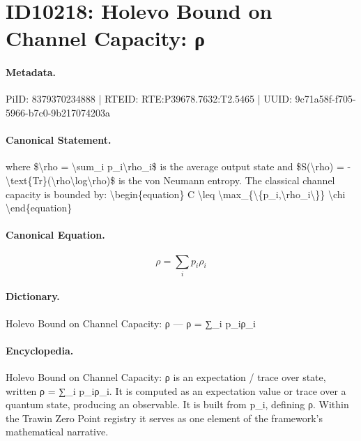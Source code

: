 \section*{ID10218: Holevo Bound on Channel Capacity: ρ}
\paragraph{Metadata.}
PiID: 8379370234888 | RTEID: RTE:P39678.7632:T2.5465 | UUID: 9c71a58f-f705-5966-b7c0-9b217074203a

\paragraph{Canonical Statement.}
where \$\textbackslash{}rho = \textbackslash{}sum\_i p\_i\textbackslash{}rho\_i\$ is the average output state and \$S(\textbackslash{}rho) = -\textbackslash{}text\{Tr\}(\textbackslash{}rho\textbackslash{}log\textbackslash{}rho)\$ is the von Neumann entropy. The classical channel capacity is bounded by: \textbackslash{}begin\{equation\} C \textbackslash{}leq \textbackslash{}max\_\{\textbackslash{}\{p\_i,\textbackslash{}rho\_i\textbackslash{}\}\} \textbackslash{}chi \textbackslash{}end\{equation\}

\paragraph{Canonical Equation.}
\[
\rho = \sum_i p_i\rho_i
\]

\paragraph{Dictionary.}
Holevo Bound on Channel Capacity: ρ — ρ = ∑\_i p\_iρ\_i

\paragraph{Encyclopedia.}
Holevo Bound on Channel Capacity: ρ is an expectation / trace over state, written ρ = ∑\_i p\_iρ\_i. It is computed as an expectation value or trace over a quantum state, producing an observable. It is built from p\_i, defining ρ. Within the Trawin Zero Point registry it serves as one element of the framework's mathematical narrative.
